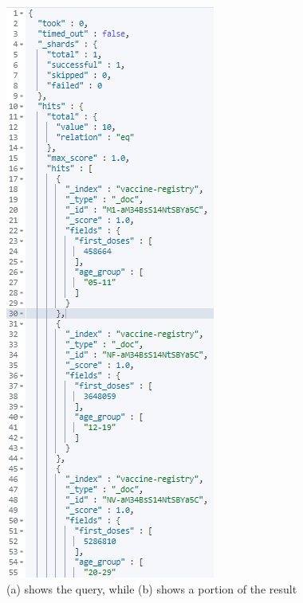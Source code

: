 \documentclass{article}[IEEEtran]
\begin{document}
\begin{figure}[H]
\begin{center}
\begin{minipage}[b]{0.4\textwidth}
    \includegraphics[width=\textwidth, frame]{Answer_Query_3.PNG}
     \subcaption{}
  \end{minipage}
  \caption{(a) shows the query, while (b) shows a portion of the result}
\end{center}
\end{figure}
\end{document}
